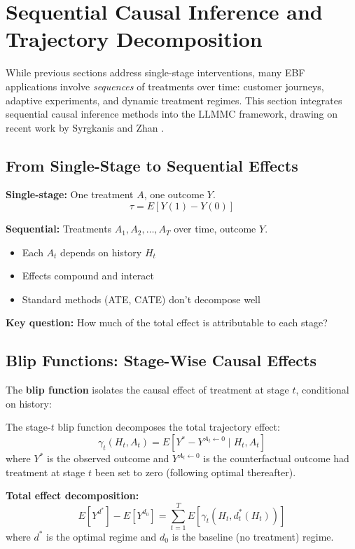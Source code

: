 \section{Sequential Causal Inference and Trajectory Decomposition}
\label{sec:iii-seq}

While previous sections address single-stage interventions, many EBF applications
involve \emph{sequences} of treatments over time: customer journeys, adaptive
experiments, and dynamic treatment regimes. This section integrates sequential
causal inference methods into the LLMMC framework, drawing on recent work by
Syrgkanis and Zhan \citep{PAP-syrgkanis2025postrl}.

\subsection{From Single-Stage to Sequential Effects}

\begin{tcolorbox}[colback=red!5!white, colframe=red!75!black,
    title=The Sequential Challenge]

\textbf{Single-stage:} One treatment $A$, one outcome $Y$.
\[
\tau = E[Y(1) - Y(0)]
\]

\textbf{Sequential:} Treatments $A_1, A_2, \ldots, A_T$ over time, outcome $Y$.
\begin{itemize}[nosep]
\item Each $A_t$ depends on history $H_t$
\item Effects compound and interact
\item Standard methods (ATE, CATE) don't decompose well
\end{itemize}

\textbf{Key question:} How much of the total effect is attributable to each stage?
\end{tcolorbox}

\subsection{Blip Functions: Stage-Wise Causal Effects}

The \textbf{blip function} \citep{PAP-robins2000msm, PAP-syrgkanis2025postrl}
isolates the causal effect of treatment at stage $t$, conditional on history:

\begin{tcolorbox}[colback=blue!5!white, colframe=blue!75!black,
    title=Axiom CAL-8: Blip Decomposition (Syrgkanis-Zhan)]
The stage-$t$ blip function decomposes the total trajectory effect:
\[
\gamma_t(H_t, A_t) = E[Y^* - Y^{A_t \leftarrow 0} \mid H_t, A_t]
\]
where $Y^*$ is the observed outcome and $Y^{A_t \leftarrow 0}$ is the counterfactual
outcome had treatment at stage $t$ been set to zero (following optimal thereafter).

\textbf{Total effect decomposition:}
\[
E[Y^{d^*}] - E[Y^{d_0}] = \sum_{t=1}^{T} E[\gamma_t(H_t, d^*_t(H_t))]
\]
where $d^*$ is the optimal regime and $d_0$ is the baseline (no treatment) regime.
\end{tcolorbox}

